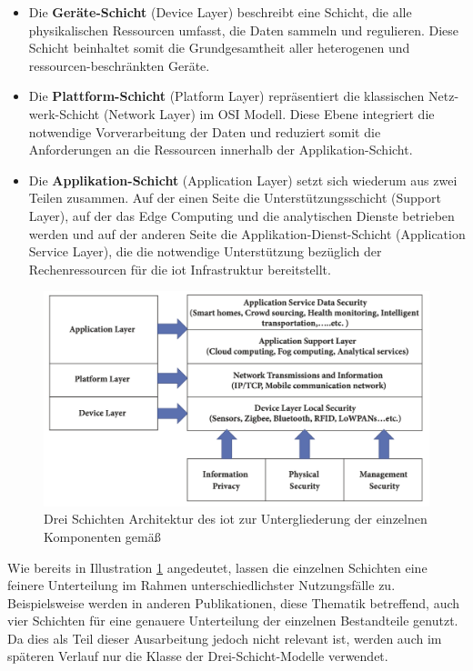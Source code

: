 \begin{itemize}
    \item Die \textbf{Geräte-Schicht} (Device Layer) beschreibt eine Schicht, die alle physikalischen Ressourcen umfasst, die Daten sammeln und regulieren. Diese Schicht beinhaltet somit die Grundgesamtheit aller heterogenen und ressourcen-beschränkten Geräte.
    \item Die \textbf{Plattform-Schicht} (Platform Layer) repräsentiert die klassischen Netz-werk-Schicht (Network Layer) im OSI Modell. Diese Ebene integriert die notwendige Vorverarbeitung der Daten und reduziert somit die Anforderungen an die Ressourcen innerhalb der Applikation-Schicht.
    \item Die \textbf{Applikation-Schicht} (Application Layer) setzt sich wiederum aus zwei Teilen zusammen. Auf der einen Seite die Unterstützungsschicht (Support Layer), auf der das Edge Computing und die analytischen Dienste betrieben werden und auf der anderen Seite die Applikation-Dienst-Schicht (Application Service Layer), die die notwendige Unterstützung bezüglich der Rechenressourcen für die \ac{iot} Infrastruktur bereitstellt.
\end{itemize}

\begin{figure}
    \includegraphics[width=\textwidth]{fundamentals/pictures/IoT_Layer_Architecture}
    \caption{Drei Schichten Architektur des \ac{iot} zur Untergliederung der einzelnen Komponenten gemäß \cite{Seliem2018}}
    \label{fig:drei-schichten-iot}
\end{figure}

\noindent Wie bereits in Illustration \ref{fig:drei-schichten-iot} angedeutet, lassen die einzelnen Schichten eine feinere Unterteilung im Rahmen unterschiedlichster Nutzungsfälle zu. Beispielsweise werden in anderen Publikationen, diese Thematik betreffend, auch vier Schichten für eine genauere Unterteilung der einzelnen Bestandteile genutzt. Da dies als Teil dieser Ausarbeitung jedoch nicht relevant ist, werden auch im späteren Verlauf nur die Klasse der Drei-Schicht-Modelle verwendet.


